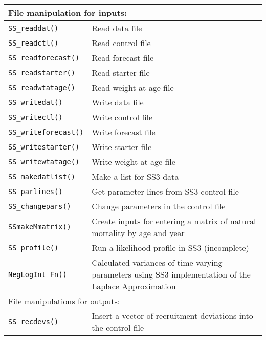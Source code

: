 \begin{center}
\begin{longtable}{p{4.5cm} p{10.52cm}}
		\multicolumn{2}{l}{File manipulation for inputs:} \Tstrut\Bstrut\\
		\hline
		\texttt{SS\_readdat()} \Tstrut & Read data file \\
		\texttt{SS\_readctl()} \Tstrut & Read  control file \\
		\texttt{SS\_readforecast()} \Tstrut & Read forecast file \\
		\texttt{SS\_readstarter()} \Tstrut & Read starter file \\
		\texttt{SS\_readwtatage()} \Tstrut & Read weight-at-age file \\
		\texttt{SS\_writedat()} \Tstrut & Write data file \\
		\texttt{SS\_writectl()} \Tstrut & Write control file \\
		\texttt{SS\_writeforecast()} \Tstrut & Write forecast file \\
		\texttt{SS\_writestarter()} \Tstrut & Write starter file \\
		\texttt{SS\_writewtatage()} \Tstrut & Write weight-at-age file \\
		\texttt{SS\_makedatlist()} \Tstrut & Make a list for SS3 data \\
		\texttt{SS\_parlines()} \Tstrut & Get parameter lines from SS3 control file \\
		\texttt{SS\_changepars()} \Tstrut  & Change parameters in the control file \\
		\texttt{SSmakeMmatrix()} \Tstrut & Create inputs for entering a matrix of natural mortality by age and year \\
		\texttt{SS\_profile()} \Tstrut & Run a likelihood profile in SS3 (incomplete) \\
		\texttt{NegLogInt\_Fn()} \Tstrut & Calculated variances of time-varying parameters using SS3 implementation of the Laplace Approximation \Bstrut\\
		\hline
		
		\multicolumn{2}{l}{File manipulations for outputs:} \Tstrut\Bstrut\\
		\hline
		\texttt{SS\_recdevs()} \Tstrut & Insert a vector of recruitment deviations into the control file \\
		\hline

	\end{longtable}
\end{center}

\pagebreak
